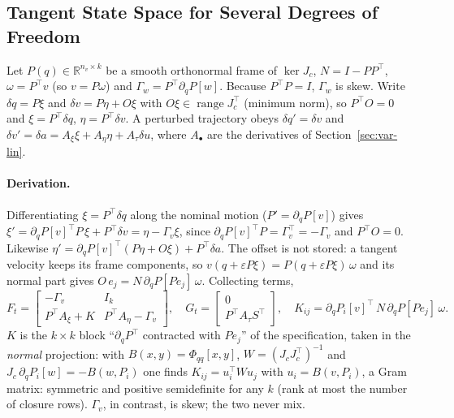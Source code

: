 \documentclass[11pt,a4paper]{article}
\newcommand{\R}{\mathbb{R}}
\newcommand{\range}{\operatorname{range}}
\begin{document}
\subsection{Tangent State Space for Several Degrees of Freedom}
\label{sec:var-lin-k}

Let $P(q)\in\R^{n_v\times k}$ be a smooth orthonormal frame of $\ker J_c$,
$N=I-PP^{\!\top}$, $\omega=P^{\!\top}v$ (so $v=P\omega$) and
$\Gamma_w=P^{\!\top}\partial_qP[w]$.  Because $P^{\!\top}P=I$, $\Gamma_w$ is
skew.  Write $\delta q=P\xi$ and $\delta v=P\eta+O\xi$ with $O\xi\in
\range J_c^{\!\top}$ (minimum norm), so $P^{\!\top}O=0$ and
$\xi=P^{\!\top}\delta q$, $\eta=P^{\!\top}\delta v$.  A perturbed trajectory
obeys $\delta q'=\delta v$ and $\delta v'=\delta a=A_\xi\xi+A_\eta\eta+A_\tau\delta u$,
where $A_\bullet$ are the derivatives of Section~\ref{sec:var-lin}.

\paragraph{Derivation.}  Differentiating $\xi=P^{\!\top}\delta q$ along the
nominal motion ($P'=\partial_qP[v]$) gives
$\xi'=\partial_qP[v]^{\!\top}P\,\xi+P^{\!\top}\delta v=\eta-\Gamma_v\xi$,
since $\partial_qP[v]^{\!\top}P=\Gamma_v^{\!\top}=-\Gamma_v$ and $P^{\!\top}O=0$.
Likewise $\eta'=\partial_qP[v]^{\!\top}(P\eta+O\xi)+P^{\!\top}\delta a$.  The
offset is not stored: a tangent velocity keeps its frame components, so
$v(q+\varepsilon P\xi)=P(q+\varepsilon P\xi)\,\omega$ and its normal part gives
$O\,e_j=N\,\partial_qP[Pe_j]\,\omega$.  Collecting terms,
\begin{equation}
F_t=\begin{bmatrix}-\Gamma_v & I_k\\[2pt]
P^{\!\top}A_\xi+K & P^{\!\top}A_\eta-\Gamma_v\end{bmatrix},\quad
G_t=\begin{bmatrix}0\\ P^{\!\top}A_\tau S^{\!\top}\end{bmatrix},\quad
K_{ij}=\partial_qP_i[v]^{\!\top}\,N\,\partial_qP[Pe_j]\,\omega .
\label{eq:var-lin-k}
\end{equation}
$K$ is the $k\times k$ block ``$\partial_qP^{\!\top}$ contracted with
$Pe_j$'' of the specification, taken in the \emph{normal} projection: with
$B(x,y)=\Phi_{qq}[x,y]$, $W=(J_cJ_c^{\!\top})^{-1}$ and $J_c\,\partial_qP_i[w]=
-B(w,P_i)$ one finds $K_{ij}=u_i^{\!\top}Wu_j$ with $u_i=B(v,P_i)$, a Gram
matrix: symmetric and positive semidefinite for any $k$ (rank at most the
number of closure rows).  $\Gamma_v$, in contrast, is skew; the two never
mix.
\end{document}
